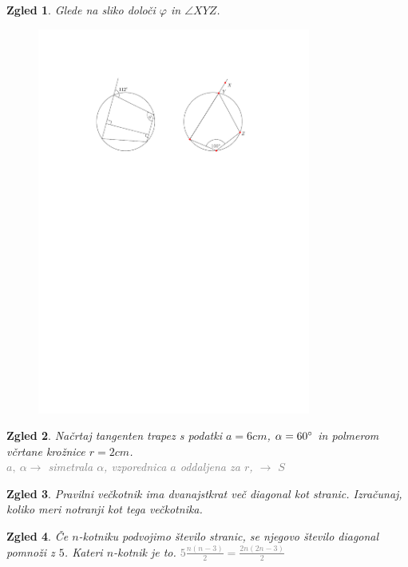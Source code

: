 \documentclass{article}
\newtheorem*{zgled}{Zgled}
\begin{document}
\begin{zgled}
    Glede na sliko določi $\varphi$ in $\angle XYZ$.
    \begin{figure}[H]
    \includegraphics[width=0.8\textwidth]{naloga.pdf}
    \centering
    \end{figure}
\end{zgled}

\begin{zgled}
    Načrtaj tangenten trapez s podatki $a=6cm$, $\alpha =60\degree$ in polmerom včrtane krožnice $r=2cm$.\\
    \textcolor{gray}{$a, \ \alpha \rightarrow$ simetrala $\alpha$, vzporednica $a$ oddaljena za $r$, $\rightarrow$ $S$}
\end{zgled}


\begin{zgled}
    Pravilni večkotnik ima dvanajstkrat več diagonal kot stranic. Izračunaj, koliko meri notranji kot tega večkotnika.
\end{zgled}

\begin{zgled}
    Če $n$-kotniku podvojimo število stranic, se njegovo število diagonal pomnoži z $5$. Kateri $n$-kotnik je to. \textcolor{gray}{$5\frac{n(n-3)}{2}=\frac{2n(2n-3)}{2}$}
\end{zgled}
\end{document}
